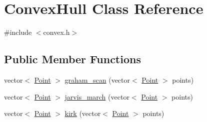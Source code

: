 \hypertarget{classConvexHull}{}\section{Convex\+Hull Class Reference}
\label{classConvexHull}


{\ttfamily \#include $<$convex.\+h$>$}

\subsection*{Public Member Functions}
\begin{DoxyCompactItemize}
\item 
vector$<$ \hyperlink{classPoint}{Point} $>$ \hyperlink{classConvexHull_aebe1ba6ff3c13d3e251aa6d16e743d78}{graham\+\_\+scan} (vector$<$ \hyperlink{classPoint}{Point} $>$ points)
\item 
vector$<$ \hyperlink{classPoint}{Point} $>$ \hyperlink{classConvexHull_a597bc298aeb5a60a931788d208767692}{jarvis\+\_\+march} (vector$<$ \hyperlink{classPoint}{Point} $>$ points)
\item 
vector$<$ \hyperlink{classPoint}{Point} $>$ \hyperlink{classConvexHull_a4f446dacec06b823a438fa4acffb1f8f}{kirk} (vector$<$ \hyperlink{classPoint}{Point} $>$ points)
\end{DoxyCompactItemize}
